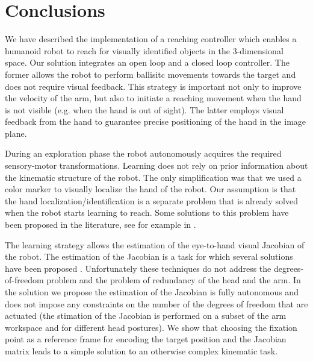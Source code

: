 \section{Conclusions}
We have described the implementation of a reaching controller which 
enables a humanoid robot to reach for visually identified objects 
in the 3-dimensional space. Our solution integrates an open loop and 
a closed loop controller. The former allows the robot to perform 
ballisitc movements towards the target and does not require visual feedback.
This strategy is important not only to improve the velocity of the arm, but 
also to initiate a reaching movement when the hand is not visible (e.g. 
when the hand is out of sight). The latter employs visual feedback from 
the hand to guarantee precise positioning of the hand in the image plane.

During an exploration phase the robot autonomously acquires the required 
sensory-motor transformations. Learning does not rely on prior information 
about the kinematic structure of the robot. The only simplification was 
that we used a color marker to visually localize the hand of the robot. 
Our assumption is that the hand localization/identification is a separate 
problem that is already solved when the robot starts learning to reach. 
Some solutions to this problem have been proposed in the literature, 
see for example in \cite{Natale05,edsinger06what}.

The learning strategy allows the estimation of the eye-to-hand visual 
Jacobian of the robot. The estimation of the Jacobian is a task for which 
several solutions have been proposed 
\cite{Hosoda94versatile,Mansard06jacobian,Lapreste04efficient,scaz07fast}.
Unfortunately these techniques do not address the degrees-of-freedom problem 
and the problem of redundancy of the head and the arm. In the solution we
propose the estimation of the Jacobian is fully autonomous and 
does not impose any constraints on the number of the degrees of freedom
that are actuated (the stimation of the Jacobian is performed on a subset 
of the arm workspace and for different head postures). We show that 
choosing the fixation point as a reference frame for encoding the target 
position and the Jacobian matrix leads to a simple solution to an otherwise 
complex kinematic task.

